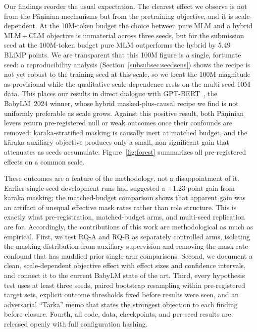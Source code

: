 Our findings reorder the usual expectation. The clearest effect we observe is not from the Pāṇinian mechanisms but from the pretraining objective, and it is scale-dependent. At the 10M-token budget the choice between pure MLM and a hybrid MLM\,+\,CLM objective is immaterial across three seeds, but for the submission seed at the 100M-token budget pure MLM outperforms the hybrid by 5.49 BLiMP points. We are transparent that this 100M figure is a single, fortunate seed: a reproducibility analysis (Section~\ref{subsubsec:seedsens}) shows the recipe is not yet robust to the training seed at this scale, so we treat the 100M magnitude as provisional while the qualitative scale-dependence rests on the multi-seed 10M data. This places our results in direct dialogue with GPT-BERT~\cite{CharpentierSamuel2024}, the BabyLM~2024 winner, whose hybrid masked-plus-causal recipe we find is not uniformly preferable as scale grows. Against this positive result, both Pāṇinian levers return pre-registered null or weak outcomes once their confounds are removed: kāraka-stratified masking is causally inert at matched budget, and the kāraka auxiliary objective produces only a small, non-significant gain that attenuates as seeds accumulate. Figure~\ref{fig:forest} summarizes all pre-registered effects on a common scale.

These outcomes are a feature of the methodology, not a disappointment of it. Earlier single-seed development runs had suggested a $+1.23$-point gain from kāraka masking; the matched-budget comparison shows that apparent gain was an artifact of unequal effective mask rates rather than role structure. This is exactly what pre-registration, matched-budget arms, and multi-seed replication are for. Accordingly, the contributions of this work are methodological as much as empirical. First, we test RQ-A and RQ-B as separately controlled arms, isolating the masking distribution from auxiliary supervision and removing the mask-rate confound that has muddied prior single-arm comparisons. Second, we document a clean, scale-dependent objective effect with effect sizes and confidence intervals, and connect it to the current BabyLM state of the art. Third, every hypothesis test uses at least three seeds, paired bootstrap resampling within pre-registered target sets, explicit outcome thresholds fixed before results were seen, and an adversarial ``Tarka'' memo that states the strongest objection to each finding before closure. Fourth, all code, data, checkpoints, and per-seed results are released openly with full configuration hashing.

